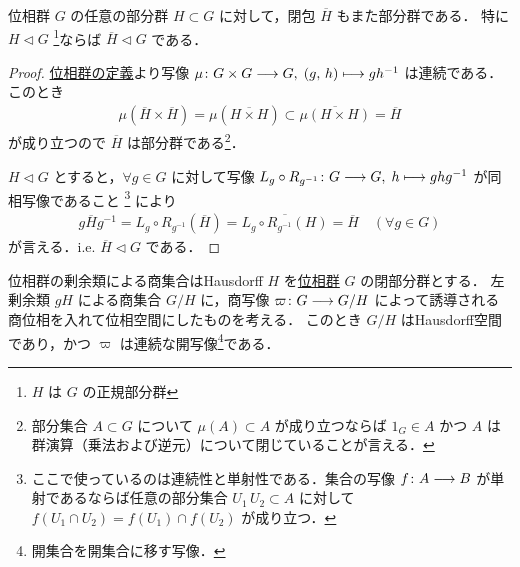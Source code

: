 \documentclass[algtopo_main]{subfiles}
\begin{document}
\begin{myprop}[]{}
    位相群 $G$ の任意の部分群 $H \subset G$ に対して，閉包 $\overline{H}$ もまた部分群である．
    特に $H \triangleleft G$ \footnote{$H$ は $G$ の正規部分群}ならば $\overline{H} \triangleleft G$ である．
\end{myprop}

\begin{proof}
    \hyperref[def:TG]{位相群の定義}より写像 $\mu \colon G \times G \longrightarrow G,\; (g,\, h) \longmapsto gh^{-1}$ は連続である．このとき
    \begin{align}
        \mu(\overline{H}\times \overline{H}) = \mu(\overline{H \times H}) \subset\overline{\mu(H \times H)} = \overline{H}
    \end{align}
    が成り立つので $\overline{H}$ は部分群である\footnote{部分集合 $A \subset G$ について $\mu(A) \subset A$ が成り立つならば $1_G \in A$ かつ $A$ は群演算（乗法および逆元）について閉じていることが言える．}．

    $H \triangleleft G$ とすると，$\forall g \in G$ に対して写像 $L_g \circ R_{g^{-1}} \colon G \longrightarrow G,\; h \longmapsto ghg^{-1}$ が同相写像であること
    \footnote{ここで使っているのは連続性と単射性である．集合の写像 $f \colon A \longrightarrow B$ が単射であるならば任意の部分集合 $U_1\, U_2 \subset A$ に対して $f(U_1 \cap U_2) = f(U_1) \cap f(U_2)$ が成り立つ．}
    により
    \begin{align}
        g \overline{H} g^{-1} = L_g \circ R_{g^{-1}} (\overline{H}) = \overline{L_g \circ R_{g^{-1}}(H)} = \overline{H} \quad (\forall g \in G)
    \end{align}
    が言える．i.e. $\overline{H} \triangleleft G$ である．
\end{proof}

\begin{myprop}[label=prop:TG-mod]{位相群の剰余類による商集合はHausdorff}
    $H$ を\hyperref[def:TG]{位相群} $G$ の閉部分群とする．
    左剰余類 $gH$ による商集合 $G/H$ に，商写像 $\varpi \colon G \longrightarrow G/H$ によって誘導される商位相を入れて位相空間にしたものを考える．
    このとき $G/H$ はHausdorff空間であり，かつ $\varpi$ は連続な開写像\footnote{開集合を開集合に移す写像．}である．
\end{myprop}
\end{document}
